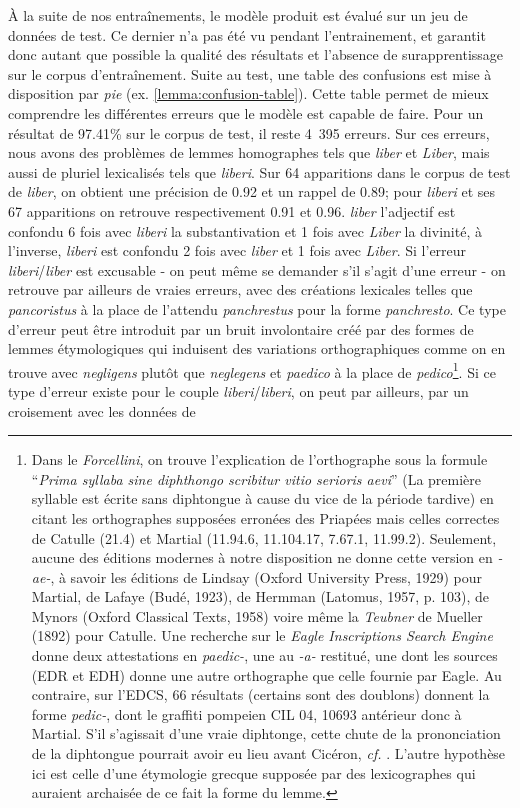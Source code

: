 À la suite de nos entraînements, le modèle produit est évalué sur un jeu de données de test. Ce dernier n'a pas été vu pendant l'entrainement, et garantit donc autant que possible la qualité des résultats et l'absence de surapprentissage sur le corpus d'entraînement. Suite au test, une table des confusions est mise à disposition par \textit{pie} (ex. \ref{lemma:confusion-table}). Cette table permet de mieux comprendre les différentes erreurs que le modèle est capable de faire. Pour un résultat de 97.41\% sur le corpus de test, il reste 4~395 erreurs. Sur ces erreurs, nous avons des problèmes de lemmes homographes tels que \textit{liber} et \textit{Liber}, mais aussi de pluriel lexicalisés tels que \textit{liberi}. Sur 64 apparitions dans le corpus de test de \textit{liber}, on obtient une précision de 0.92 et un rappel de 0.89; pour \textit{liberi} et ses 67 apparitions on retrouve respectivement 0.91 et 0.96. \textit{liber} l'adjectif est confondu 6 fois avec \textit{liberi} la substantivation et 1 fois avec \textit{Liber} la divinité, à l'inverse, \textit{liberi} est confondu 2 fois avec \textit{liber} et 1 fois avec \textit{Liber}. Si l'erreur \textit{liberi}/\textit{liber} est excusable - on peut même se demander s'il s'agit d'une erreur - on retrouve par ailleurs de vraies erreurs, avec des créations lexicales telles que \textit{pancoristus} à la place de l'attendu \textit{panchrestus} pour la forme \textit{panchresto}. Ce type d'erreur peut être introduit par un bruit involontaire créé par des formes de lemmes étymologiques qui induisent des variations orthographiques comme on en trouve avec \textit{negligens} plutôt que \textit{neglegens} et \textit{paedico} à la place de \textit{pedico}\footnote{Dans le \textit{Forcellini}, on trouve l'explication de l'orthographe sous la formule \enquote{\textit{Prima syllaba sine diphthongo scribitur vitio serioris aevi}} (La première syllable est écrite sans diphtongue à cause du vice de la période tardive) en citant les orthographes supposées erronées des Priapées mais celles correctes de Catulle (21.4) et Martial (11.94.6, 11.104.17, 7.67.1, 11.99.2). Seulement, aucune des éditions modernes à notre disposition ne donne cette version en \textit{-ae-}, à savoir les éditions de Lindsay (Oxford University Press, 1929) pour Martial, de Lafaye (Budé, 1923), de Hermman (Latomus, 1957, p. 103), de Mynors (Oxford Classical Texts, 1958) voire même la \textit{Teubner} de Mueller (1892) pour Catulle. Une recherche sur le \textit{Eagle Inscriptions Search Engine} donne deux attestations en \textit{paedic-}, une au \textit{-a-} restitué, une dont les sources (EDR et EDH) donne une autre orthographe que celle fournie par Eagle. Au contraire, sur l'EDCS, 66 résultats (certains sont des doublons) donnent la forme \textit{pedic-}, dont le graffiti pompeien CIL 04, 10693 antérieur donc à Martial. S'il s'agissait d'une vraie diphtonge, cette chute de la prononciation de la diphtongue pourrait avoir eu lieu avant Cicéron, \textit{cf.} \cite{sturtevant_monophthongization_1916}. L'autre hypothèse ici est celle d'une étymologie grecque supposée par des lexicographes qui auraient archaisée de ce fait la forme du lemme.}. Si ce type d'erreur existe pour le couple \textit{liberi}/\textit{liberi}, on peut par ailleurs, par un croisement avec les données de 